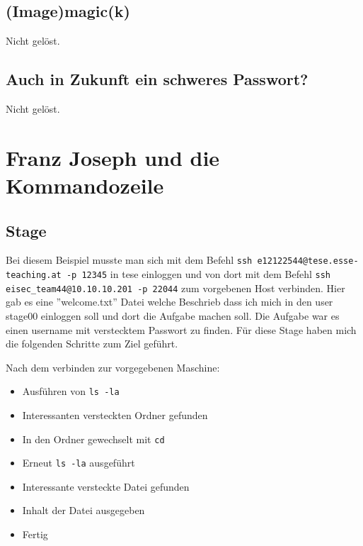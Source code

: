 \documentclass[12pt, a4paper, titlepage, oneside]{scrartcl}
\begin{document}
	\subsection{(Image)magic(k)}
	Nicht gelöst.

	\subsection{Auch in Zukunft ein schweres Passwort?}
	Nicht gelöst.

	\section{Franz Joseph und die Kommandozeile}

	\subsection{Stage}
	Bei diesem Beispiel musste man sich mit dem Befehl \lstinline{ssh e12122544@tese.esse-teaching.at -p 12345}
	in tese einloggen und von dort mit dem Befehl \lstinline{ssh eisec_team44@10.10.10.201 -p 22044}
	zum vorgebenen Host verbinden. Hier gab es eine ''welcome.txt'' Datei welche Beschrieb
	dass ich mich in den user stage00 einloggen soll und dort die Aufgabe machen soll.
	Die Aufgabe war es einen username mit verstecktem Passwort zu finden. Für diese
	Stage haben mich die folgenden Schritte zum Ziel geführt.

	Nach dem verbinden zur vorgegebenen Maschine:
	\begin{itemize}
		\item Ausführen von \lstinline{ls -la}

		\item Interessanten versteckten Ordner gefunden

		\item In den Ordner gewechselt mit \lstinline{cd}

		\item Erneut \lstinline{ls -la} ausgeführt

		\item Interessante versteckte Datei gefunden

		\item Inhalt der Datei ausgegeben

		\item Fertig
	\end{itemize}
\end{document}
